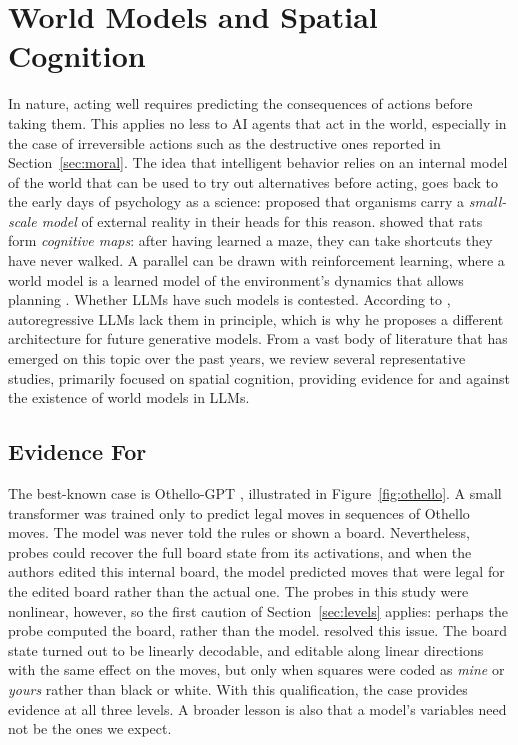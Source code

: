 \section{World Models and Spatial Cognition}\label{sec:worldmodelscog}\label{sec:worldmodels}
In nature, acting well requires predicting the consequences of actions before taking them. This applies no less to AI agents that act in the world, especially in the case of irreversible actions such as the destructive ones reported in Section~\ref{sec:moral}. 
The idea that intelligent behavior relies on an internal model of the world that can be used to try out alternatives before acting, goes back to the early days of psychology as a science: \citet{craik1943nature} proposed that organisms carry a {\em small-scale model} of external reality in their heads for this reason. \citet{tolman1948cognitive} showed that rats form \emph{cognitive maps}: after having learned a maze, they can take shortcuts they have never walked. A parallel can be drawn with reinforcement learning, where a world model is a learned model of the environment's dynamics that allows planning \citep{ha2018world}. Whether LLMs have such models is contested. According to \citet{lecun2022path}, autoregressive LLMs lack them in principle, which is why he proposes a different architecture for future generative models. From a vast body of literature that has emerged on this topic over the past years, we review several representative studies, primarily focused on spatial cognition, providing evidence for and against the existence of world models in LLMs.

\subsection{Evidence For}
The best-known case is Othello-GPT \citep{li2023emergent}, illustrated in Figure~\ref{fig:othello}. A small transformer was trained only to predict legal moves in sequences of Othello moves. The model was never told the rules or shown a board. Nevertheless, probes could recover the full board state from its activations, and when the authors edited this internal board, the model predicted moves that were legal for the edited board rather than the actual one. The probes in this study were nonlinear, however, so the first caution of Section~\ref{sec:levels} applies: perhaps the probe computed the board, rather than the model. \citet{nanda2023emergent} resolved this issue. The board state turned out to be linearly decodable, and editable along linear directions with the same effect on the moves, but only when squares were coded as {\em mine} or {\em yours} rather than black or white. With this qualification, the case provides evidence at all three levels. A broader lesson is also that a model's variables need not be the ones we expect.

